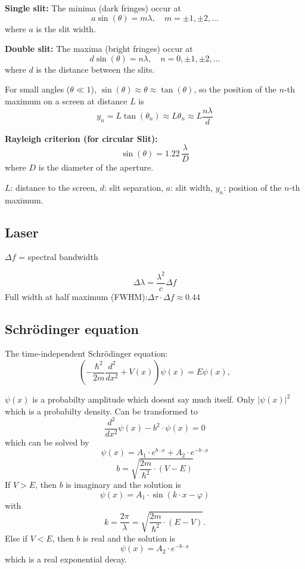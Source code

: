 \textbf{Single slit:} The minima (dark fringes) occur at
\[
a \sin(\theta) = m \lambda, \quad m = \pm 1, \pm 2, \ldots
\]
where \(a\) is the slit width.

\textbf{Double slit:} The maxima (bright fringes) occur at
\[
d \sin(\theta) = n \lambda, \quad n = 0, \pm 1, \pm 2, \ldots
\]
where \(d\) is the distance between the slits.

For small angles (\(\theta \ll 1\)), \(\sin(\theta) \approx \theta \approx \tan(\theta)\), so the position of the \(n\)-th maximum on a screen at distance \(L\) is
\[
y_n = L \tan(\theta_n) \approx L \theta_n \approx L \frac{n \lambda}{d}
\]

\textbf{Rayleigh criterion (for circular Slit):}
\[
\sin(\theta) = 1.22\, \frac{\lambda}{D}
\]
where \(D\) is the diameter of the aperture.

\(L\): distance to the screen, \(d\): slit separation, \(a\): slit width, \(y_n\): position of the \(n\)-th maximum.
\subsection{Laser}
\(\Delta f\) = spectral bandwidth

\[
\Delta \lambda = \frac{\lambda^2}{c} \Delta f
\]
Full width at half maximum (FWHM):\(\Delta \tau \cdot \Delta f \approx 0.44\)
\subsection{Schrödinger equation}
The time-independent Schrödinger equation:
\begin{equation*}
    \label{eq:time-independent-schroedinger}
\left(-\frac{\hbar^2}{2m} \frac{d^2}{dx^2} + V(x)\right) \psi(x) = E \psi(x),
\end{equation*}

\(\psi(x)\) is a probabilty amplitude which doesnt say much itself. Only \(|\psi(x)|^2\) which is a probabilty density.
Can be transformed to 
\begin{equation*}
    \frac{d^2}{dx^2} \psi(x) - b^2 \cdot \psi(x) = 0
\end{equation*}
which can be solved by
\begin{equation*}
    \psi(x) = A_1 \cdot e^{b \cdot x} + A_2 \cdot e^{-b \cdot x}
\end{equation*}
\begin{equation*}
    b = \sqrt{\frac{2m}{\hbar^2}\cdot (V-E)}
\end{equation*}
If \(V > E\), then \(b\) is imaginary and the solution is
\begin{equation*}
    \psi(x) = A_1 \cdot \sin(k \cdot x - \varphi)
\end{equation*}
with
\begin{equation*}
    k =\frac{2\pi}{\lambda} =  \sqrt{\frac{2m}{\hbar^2}\cdot (E-V)}.
\end{equation*}
Else if \(V < E\), then \(b\) is real and the solution is
\begin{equation*}
    \psi(x) = A_2 \cdot e^{-b \cdot x}
\end{equation*}
which is a real exponential decay.

